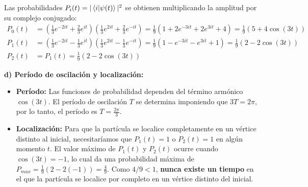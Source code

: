 Las probabilidades $P_i(t) = |\bra{i}\ket{\psi(t)}|^2$ se obtienen multiplicando la amplitud por su complejo conjugado:
\begin{align*}
P_0(t) &= \left(\frac{1}{3}e^{-2it} + \frac{2}{3}e^{it}\right)\left(\frac{1}{3}e^{2it} + \frac{2}{3}e^{-it}\right) = \frac{1}{9}\left(1 + 2e^{-3it} + 2e^{3it} + 4\right) = \frac{1}{9}\left(5 + 4\cos(3t)\right) \\
P_1(t) &= \left(\frac{1}{3}e^{-2it} - \frac{1}{3}e^{it}\right)\left(\frac{1}{3}e^{2it} - \frac{1}{3}e^{-it}\right) = \frac{1}{9}\left(1 - e^{-3it} - e^{3it} + 1\right) = \frac{1}{9}\left(2 - 2\cos(3t)\right) \\
P_2(t) &= P_1(t) = \frac{1}{9}\left(2 - 2\cos(3t)\right)
\end{align*}

\vspace{0.5cm}
\textbf{d) Período de oscilación y localización:}
\begin{itemize}
    \item \textbf{Período:} Las funciones de probabilidad dependen del término armónico $\cos(3t)$. El período de oscilación $T$ se determina imponiendo que $3T = 2\pi$, por lo tanto, el período es $T = \frac{2\pi}{3}$.
    \item \textbf{Localización:} Para que la partícula se localice completamente en un vértice distinto al inicial, necesitaríamos que $P_1(t) = 1$ o $P_2(t) = 1$ en algún momento $t$. El valor máximo de $P_1(t)$ y $P_2(t)$ ocurre cuando $\cos(3t) = -1$, lo cual da una probabilidad máxima de $P_{max} = \frac{1}{9}(2 - 2(-1)) = \frac{4}{9}$. Como $4/9 < 1$, \textbf{nunca existe un tiempo} en el que la partícula se localice por completo en un vértice distinto del inicial.
\end{itemize}
\vspace{0.5cm}
